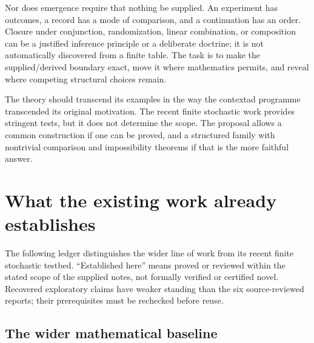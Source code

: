 \documentclass[11pt]{article}
\theoremstyle{remark}
\begin{document}
Nor does emergence require that nothing be supplied. An experiment has outcomes, a record has a mode of comparison, and a continuation has an order. Closure under conjunction, randomization, linear combination, or composition can be a justified inference principle or a deliberate doctrine; it is not automatically discovered from a finite table. The task is to make the supplied/derived boundary exact, move it where mathematics permits, and reveal where competing structural choices remain.

The theory should transcend its examples in the way the contextad programme transcended its original motivation. The recent finite stochastic work provides stringent tests, but it does not determine the scope. The proposal allows a common construction if one can be proved, and a structured family with nontrivial comparison and impossibility theorems if that is the more faithful answer.

\section{What the existing work already establishes}
\label{sec:ledger}

The following ledger distinguishes the wider line of work from its recent finite stochastic testbed. ``Established here'' means proved or reviewed within the stated scope of the supplied notes, not formally verified or certified novel. Recovered exploratory claims have weaker standing than the six source-reviewed reports; their prerequisites must be rechecked before reuse.

\subsection{The wider mathematical baseline}
\end{document}
